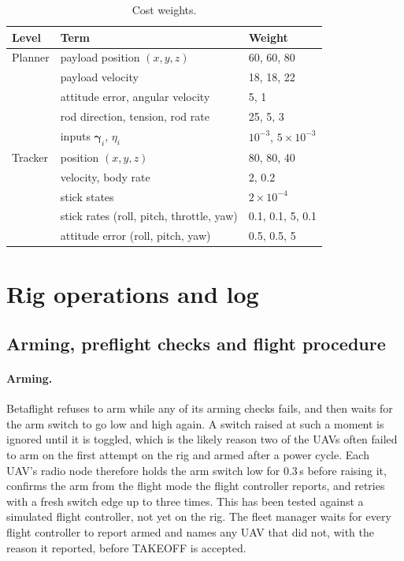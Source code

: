 \begin{table}[h]
\centering
\caption{Cost weights.}
\label{tab:weights}
\begin{tabular}{lll}
\toprule
Level & Term & Weight \\
\midrule
Planner & payload position $(x, y, z)$ & 60, 60, 80 \\
        & payload velocity & 18, 18, 22 \\
        & attitude error, angular velocity & 5, 1 \\
        & rod direction, tension, rod rate & 25, 5, 3 \\
        & inputs $\boldsymbol{\gamma}_i$, $\eta_i$ & $10^{-3}$, $5\times10^{-3}$ \\
\midrule
Tracker & position $(x, y, z)$ & 80, 80, 40 \\
        & velocity, body rate & 2, 0.2 \\
        & stick states & $2\times10^{-4}$ \\
        & stick rates (roll, pitch, throttle, yaw) & 0.1, 0.1, 5, 0.1 \\
        & attitude error (roll, pitch, yaw) & 0.5, 0.5, 5 \\
\bottomrule
\end{tabular}
\end{table}



\section{Rig operations and log}
\label{sec:app_rig}

\subsection{Arming, preflight checks and flight procedure}

\paragraph{Arming.} Betaflight refuses to arm while any of its arming checks fails, and then waits
for the arm switch to go low and high again. A switch raised at such a moment is ignored until it is
toggled, which is the likely reason two of the UAVs often failed to arm on the first attempt on the
rig and armed after a power cycle. Each UAV's radio node therefore holds the arm switch low for
0.3\,s before raising it, confirms the arm from the flight mode the flight controller reports, and
retries with a fresh switch edge up to three times. This has been tested against a simulated flight
controller, not yet on the rig. The fleet manager waits
for every flight controller to report armed and names any UAV that did not, with the reason it
reported, before TAKEOFF is accepted.

